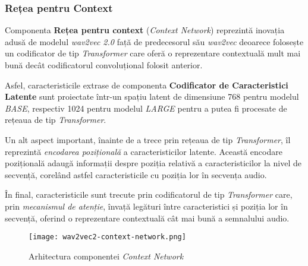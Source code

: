 \subsubsection{Rețea pentru Context}
\vspace{1em}
Componenta \textbf{Rețea pentru context} (\textit{Context Network}) reprezintă inovația adusă de modelul
\textit{wav2vec 2.0} față de predecesorul său \textit{wav2vec} deoarece folosește un codificator de tip
\textit{Transformer} care oferă o reprezentare contextuală mult mai bună decât codificatorul convoluțional
folosit anterior.
\par
Asfel, caracteristicile extrase de componenta \textbf{Codificator de Caracteristici Latente} sunt 
proiectate într-un spațiu latent de dimensiune 768 pentru modelul \textit{BASE}, respectiv 1024 pentru modelul
\textit{LARGE} pentru a putea fi procesate de rețeaua de tip \textit{Transformer}. 
\par
Un alt aspect important, înainte de a trece prin rețeaua de tip \textit{Transformer}, îl reprezintă
\textit{encodarea pozițională} a caracteristicilor latente. Această encodare pozițională adaugă
informații despre poziția relativă a caracteristicilor la nivel de secvență, corelând astfel
caracteristicile cu poziția lor în secvența audio.
\par
În final, caracteristicile sunt trecute prin codificatorul de tip \textit{Transformer} care,
prin \textit{mecanismul de atenție}, învață legături între caracteristici și poziția lor în secvență,
oferind o reprezentare contextuală cât mai bună a semnalului audio. 

\vspace{2em}
\begin{figure}[h]
    \centering
    \texttt{[image: wav2vec2-context-network.png]}
    \caption{Arhitectura componentei \textit{Context Network} \protect\footnotemark[1]}
    \label{fig:wav2vec2-context-network}
\end{figure}
\vspace{1em}

